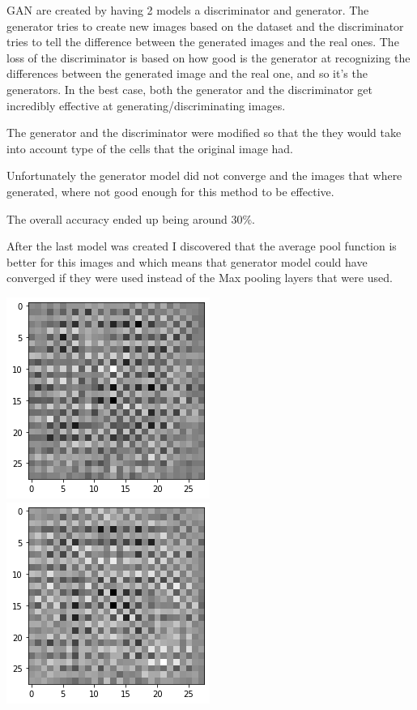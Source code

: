\documentclass[25pt, a0paper, portrait]{tikzposter}
\begin{document}
\begin{columns}
\begin{subcolumns}
{			GAN\cite{gan} are created by having 2 models a discriminator and generator. The generator tries to create 
			new images based on the dataset and the discriminator tries to tell the difference between the generated 
			images and the real ones. The loss of the discriminator is based on how good is the generator at recognizing 
			the differences between the generated image and the real one, and so it's the generators. In the best case, 
			both the generator and the discriminator get incredibly effective at generating/discriminating images.

			The generator and the discriminator were modified so that the they would take into account type of the cells 
			that the original image had.

			Unfortunately the generator model did not converge and the images that where generated, where not good 
			enough for this method to be effective.

			The overall accuracy ended up being around $30\%$.

			After the last model was created I discovered that the average pool function is better for this images and 
			which means that generator model could have converged if they were used instead of the Max pooling layers 
			that were used.

			\vspace*{.5em}

			\begin{tikzfigure}
				\includegraphics[width=.3\linewidth]{figures/fail_image.png}
				\includegraphics[width=.3\linewidth]{figures/fail_image_2.png}
			\end{tikzfigure}

}
\end{subcolumns}
\end{columns}
\end{document}
